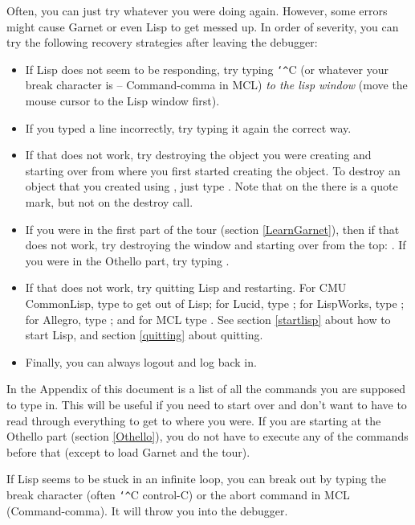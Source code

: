 Often, you can just try whatever you were doing again.  However, some
errors might cause Garnet or even Lisp to get messed up.  In order of
severity, you can try the following recovery strategies after leaving
the debugger:
\begin{itemize}
\item If Lisp does not seem to be responding, try typing {\tt\char`\^}C (or whatever your
break character is -- Command-comma in MCL) {\it to the lisp window}
(move the mouse cursor to the Lisp window first).

\item If you typed a line incorrectly, try typing it again the correct way.

\item If that does not work, try destroying the object you were creating and
starting over from where you first started creating the object.  To destroy
an object that you created using , just type
.  Note that on the  there
is a quote mark, but not on the destroy call.

\item If you were in the first part of the tour (section \ref{LearnGarnet}), then
if that does not work, try destroying the window and starting over from the
top: .  If you were in the Othello part, try typing
.

\item If that does not work, try quitting Lisp and restarting.  For CMU
CommonLisp, type  to get out of Lisp; for Lucid, type
; for LispWorks, type ;  for Allegro,
type ; and for MCL type .  See section
\ref{startlisp} about how to start Lisp, and section \ref{quitting}
about quitting.

\item Finally, you can always logout and log back in.
\end{itemize}

In the Appendix
of this document is a list of all the commands you are supposed
to type in.  This will be useful if you need to start over and don't want
to have to read through everything to get to where you were.  If you
are starting at the Othello part (section \ref{Othello}), you do not have
to execute any of the commands before that (except to load Garnet and the
tour).

If Lisp seems to be stuck in an infinite loop, you can break out by typing
the break character (often {\tt\char`\^}C \dash control-C) or the abort command in
MCL (Command-comma).  It will throw you into the debugger.

